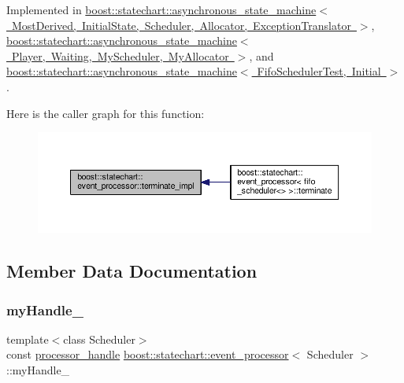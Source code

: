 Implemented in \mbox{\hyperlink{classboost_1_1statechart_1_1asynchronous__state__machine_a528bedaf8c4d4b3fefc78984673bf30b}{boost\+::statechart\+::asynchronous\+\_\+state\+\_\+machine$<$ Most\+Derived, Initial\+State, Scheduler, Allocator, Exception\+Translator $>$}}, \mbox{\hyperlink{classboost_1_1statechart_1_1asynchronous__state__machine_a528bedaf8c4d4b3fefc78984673bf30b}{boost\+::statechart\+::asynchronous\+\_\+state\+\_\+machine$<$ Player, Waiting, My\+Scheduler, My\+Allocator $>$}}, and \mbox{\hyperlink{classboost_1_1statechart_1_1asynchronous__state__machine_a528bedaf8c4d4b3fefc78984673bf30b}{boost\+::statechart\+::asynchronous\+\_\+state\+\_\+machine$<$ Fifo\+Scheduler\+Test, Initial $>$}}.

Here is the caller graph for this function\+:
\nopagebreak
\begin{figure}[H]
\begin{center}
\leavevmode
\includegraphics[width=350pt]{classboost_1_1statechart_1_1event__processor_a3f5f4c757909fca5f389b485a789c24e_icgraph}
\end{center}
\end{figure}


\subsection{Member Data Documentation}
\mbox{\label{classboost_1_1statechart_1_1event__processor_a97d7bf7f1f4c1fcfec7982ede809d9c4}} 
\subsubsection{\texorpdfstring{my\+Handle\+\_\+}{myHandle\_}}
{\footnotesize\ttfamily template$<$class Scheduler$>$ \\
const \mbox{\hyperlink{classboost_1_1statechart_1_1event__processor_a0cb7488f303c3c79a6bd52b58ce43a2a}{processor\+\_\+handle}} \mbox{\hyperlink{classboost_1_1statechart_1_1event__processor}{boost\+::statechart\+::event\+\_\+processor}}$<$ Scheduler $>$\+::my\+Handle\+\_\+\hspace{0.3cm}{\ttfamily [private]}}


